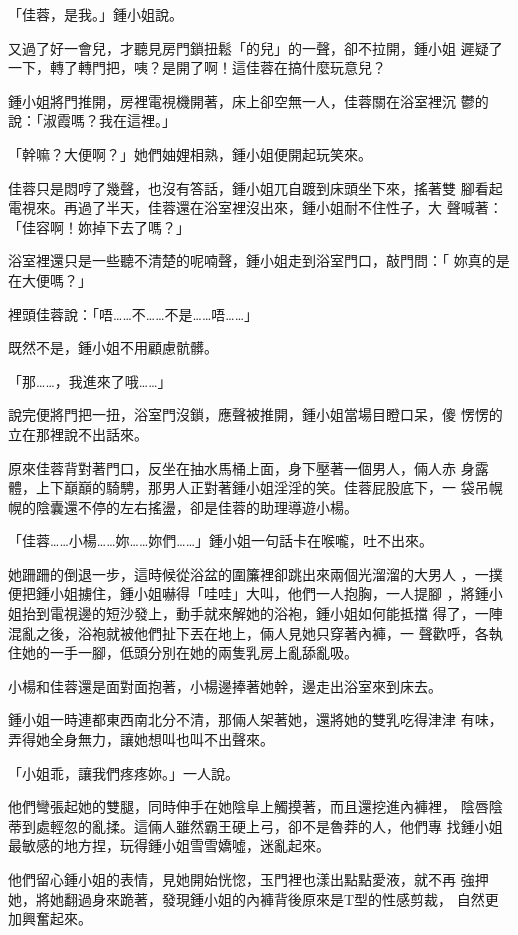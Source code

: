 「佳蓉，是我。」鍾小姐說。

又過了好一會兒，才聽見房門鎖扭鬆「的兒」的一聲，卻不拉開，鍾小姐
遲疑了一下，轉了轉門把，咦？是開了啊！這佳蓉在搞什麼玩意兒？

鍾小姐將門推開，房裡電視機開著，床上卻空無一人，佳蓉關在浴室裡沉
鬱的說：「淑霞嗎？我在這裡。」

「幹嘛？大便啊？」她們妯娌相熟，鍾小姐便開起玩笑來。

佳蓉只是悶哼了幾聲，也沒有答話，鍾小姐兀自踱到床頭坐下來，搖著雙
腳看起電視來。再過了半天，佳蓉還在浴室裡沒出來，鍾小姐耐不住性子，大
聲喊著：「佳容啊！妳掉下去了嗎？」

浴室裡還只是一些聽不清楚的呢喃聲，鍾小姐走到浴室門口，敲門問：「
妳真的是在大便嗎？」

裡頭佳蓉說：「唔……不……不是……唔……」

既然不是，鍾小姐不用顧慮骯髒。

「那……，我進來了哦……」

說完便將門把一扭，浴室門沒鎖，應聲被推開，鍾小姐當場目瞪口呆，傻
愣愣的立在那裡說不出話來。

原來佳蓉背對著門口，反坐在抽水馬桶上面，身下壓著一個男人，倆人赤
身露體，上下巔巔的騎騁，那男人正對著鍾小姐淫淫的笑。佳蓉屁股底下，一
袋吊幌幌的陰囊還不停的左右搖盪，卻是佳蓉的助理導遊小楊。

「佳蓉……小楊……妳……妳們……」鍾小姐一句話卡在喉嚨，吐不出來。

她跚跚的倒退一步，這時候從浴盆的圍簾裡卻跳出來兩個光溜溜的大男人
，一撲便把鍾小姐擄住，鍾小姐嚇得「哇哇」大叫，他們一人抱胸，一人提腳
，將鍾小姐抬到電視邊的短沙發上，動手就來解她的浴袍，鍾小姐如何能抵擋
得了，一陣混亂之後，浴袍就被他們扯下丟在地上，倆人見她只穿著內褲，一
聲歡呼，各執住她的一手一腳，低頭分別在她的兩隻乳房上亂舔亂吸。

小楊和佳蓉還是面對面抱著，小楊邊捧著她幹，邊走出浴室來到床去。

鍾小姐一時連都東西南北分不清，那倆人架著她，還將她的雙乳吃得津津
有味，弄得她全身無力，讓她想叫也叫不出聲來。

「小姐乖，讓我們疼疼妳。」一人說。

他們彎張起她的雙腿，同時伸手在她陰阜上觸摸著，而且還挖進內褲裡，
陰唇陰蒂到處輕忽的亂揉。這倆人雖然霸王硬上弓，卻不是魯莽的人，他們專
找鍾小姐最敏感的地方捏，玩得鍾小姐雪雪嬌噓，迷亂起來。

他們留心鍾小姐的表情，見她開始恍惚，玉門裡也漾出點點愛液，就不再
強押她，將她翻過身來跪著，發現鍾小姐的內褲背後原來是T型的性感剪裁，
自然更加興奮起來。

